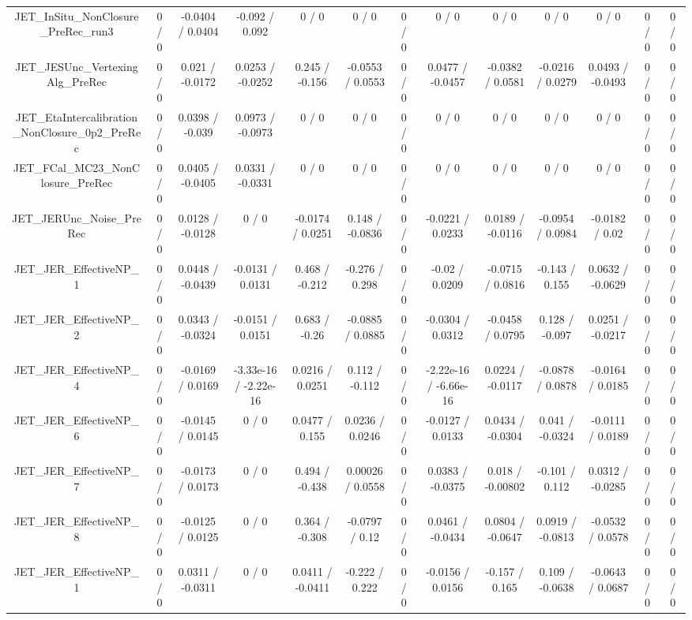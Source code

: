 \documentclass[10pt]{article}
\begin{document}
\begin{table}[htbp]
\begin{center}
\begin{tabular}{|c|c|c|c|c|c|c|c|c|c|c|c|c|}
  JET_InSitu_NonClosure_PreRec_run3 & 0 / 0 & -0.0404 / 0.0404 & -0.092 / 0.092 & 0 / 0 & 0 / 0 & 0 / 0 & 0 / 0 & 0 / 0 & 0 / 0 & 0 / 0 & 0 / 0 & 0 / 0 \\ 
  JET_JESUnc_VertexingAlg_PreRec & 0 / 0 & 0.021 / -0.0172 & 0.0253 / -0.0252 & 0.245 / -0.156 & -0.0553 / 0.0553 & 0 / 0 & 0.0477 / -0.0457 & -0.0382 / 0.0581 & -0.0216 / 0.0279 & 0.0493 / -0.0493 & 0 / 0 & 0 / 0 \\ 
  JET_EtaIntercalibration_NonClosure_0p2_PreRec & 0 / 0 & 0.0398 / -0.039 & 0.0973 / -0.0973 & 0 / 0 & 0 / 0 & 0 / 0 & 0 / 0 & 0 / 0 & 0 / 0 & 0 / 0 & 0 / 0 & 0 / 0 \\ 
  JET_FCal_MC23_NonClosure_PreRec & 0 / 0 & 0.0405 / -0.0405 & 0.0331 / -0.0331 & 0 / 0 & 0 / 0 & 0 / 0 & 0 / 0 & 0 / 0 & 0 / 0 & 0 / 0 & 0 / 0 & 0 / 0 \\ 
  JET_JERUnc_Noise_PreRec & 0 / 0 & 0.0128 / -0.0128 & 0 / 0 & -0.0174 / 0.0251 & 0.148 / -0.0836 & 0 / 0 & -0.0221 / 0.0233 & 0.0189 / -0.0116 & -0.0954 / 0.0984 & -0.0182 / 0.02 & 0 / 0 & 0 / 0 \\ 
  JET_JER_EffectiveNP_1 & 0 / 0 & 0.0448 / -0.0439 & -0.0131 / 0.0131 & 0.468 / -0.212 & -0.276 / 0.298 & 0 / 0 & -0.02 / 0.0209 & -0.0715 / 0.0816 & -0.143 / 0.155 & 0.0632 / -0.0629 & 0 / 0 & 0 / 0 \\ 
  JET_JER_EffectiveNP_2 & 0 / 0 & 0.0343 / -0.0324 & -0.0151 / 0.0151 & 0.683 / -0.26 & -0.0885 / 0.0885 & 0 / 0 & -0.0304 / 0.0312 & -0.0458 / 0.0795 & 0.128 / -0.097 & 0.0251 / -0.0217 & 0 / 0 & 0 / 0 \\ 
  JET_JER_EffectiveNP_4 & 0 / 0 & -0.0169 / 0.0169 & -3.33e-16 / -2.22e-16 & 0.0216 / 0.0251 & 0.112 / -0.112 & 0 / 0 & -2.22e-16 / -6.66e-16 & 0.0224 / -0.0117 & -0.0878 / 0.0878 & -0.0164 / 0.0185 & 0 / 0 & 0 / 0 \\ 
  JET_JER_EffectiveNP_6 & 0 / 0 & -0.0145 / 0.0145 & 0 / 0 & 0.0477 / 0.155 & 0.0236 / 0.0246 & 0 / 0 & -0.0127 / 0.0133 & 0.0434 / -0.0304 & 0.041 / -0.0324 & -0.0111 / 0.0189 & 0 / 0 & 0 / 0 \\ 
  JET_JER_EffectiveNP_7 & 0 / 0 & -0.0173 / 0.0173 & 0 / 0 & 0.494 / -0.438 & 0.00026 / 0.0558 & 0 / 0 & 0.0383 / -0.0375 & 0.018 / -0.00802 & -0.101 / 0.112 & 0.0312 / -0.0285 & 0 / 0 & 0 / 0 \\ 
  JET_JER_EffectiveNP_8 & 0 / 0 & -0.0125 / 0.0125 & 0 / 0 & 0.364 / -0.308 & -0.0797 / 0.12 & 0 / 0 & 0.0461 / -0.0434 & 0.0804 / -0.0647 & 0.0919 / -0.0813 & -0.0532 / 0.0578 & 0 / 0 & 0 / 0 \\ 
  JET_JER_EffectiveNP_1 & 0 / 0 & 0.0311 / -0.0311 & 0 / 0 & 0.0411 / -0.0411 & -0.222 / 0.222 & 0 / 0 & -0.0156 / 0.0156 & -0.157 / 0.165 & 0.109 / -0.0638 & -0.0643 / 0.0687 & 0 / 0 & 0 / 0 \\ 

\end{tabular}
\end{center}
\end{table}
\end{document}
